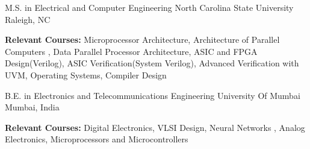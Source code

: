 \par\addvspace{1ex}


\begin{cventries}

  \cventry
    {M.S. in Electrical and Computer Engineering} %
    {North Carolina State University} %
    {Raleigh, NC} %
    {\color{darkgray}{Aug. 2017 - Expected May. 2019}} %
    {
      \begin{cvitems} %
        \item \textbf{Relevant Courses:} {Microprocessor Architecture, Architecture of Parallel Computers , Data Parallel Processor Architecture, ASIC and FPGA Design(Verilog), ASIC Verification(System Verilog), Advanced Verification with UVM, Operating Systems, Compiler Design}
      \end{cvitems}
    }

    \cventry
    {B.E. in Electronics and Telecommunications Engineering} %
    {University Of Mumbai} %
    {Mumbai, India} %
    {\color{darkgray}{Aug. 2013 - May.2017}} %
    {
      \begin{cvitems} %
        \item \textbf{Relevant Courses:} {Digital Electronics, VLSI Design, Neural Networks , Analog Electronics, Microprocessors and Microcontrollers }
      \end{cvitems}
    }

\end{cventries}
